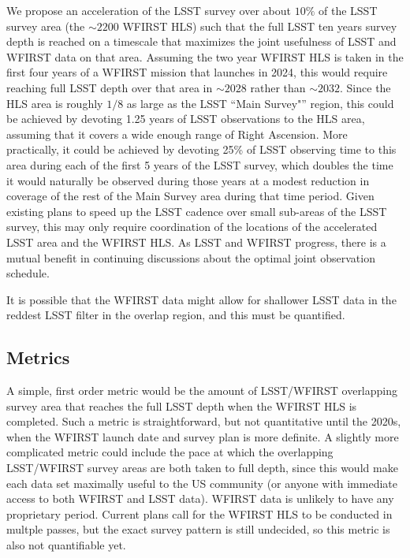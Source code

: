 We propose an acceleration of the LSST survey over about $10\%$ of the LSST survey area (the $\sim2200$ WFIRST HLS) such that the full LSST ten years survey depth is reached on a timescale that maximizes the joint usefulness of LSST and WFIRST data on that area.  Assuming the two year WFIRST HLS is taken in the first four years of a WFIRST mission that launches in 2024, this would require reaching full LSST depth over that area in $\sim2028$ rather than $\sim2032$. Since the HLS area is roughly $1/8$ as large as the LSST ``Main Survey"'' region, this could be achieved by devoting 1.25 years of LSST observations to the HLS area, assuming that it covers a wide enough range of Right Ascension.  More practically, it could be achieved by devoting 25\% of LSST observing time to this area during each of the first 5 years of the LSST survey, which doubles the time it would naturally be observed during those years at a modest reduction in coverage of the rest of the Main Survey area during that time period.   Given existing plans to speed up the LSST cadence over small sub-areas of the LSST survey, this may only require coordination of the locations of the accelerated LSST area and the WFIRST HLS. As LSST and WFIRST progress, there is a mutual benefit in continuing discussions about the optimal joint observation schedule.

It is possible that the WFIRST data might allow for shallower LSST data in the reddest LSST filter in the overlap region, and this must be quantified. 



\subsection{Metrics}
\label{sec:\secname:metrics}
A simple, first order metric would be the amount of LSST/WFIRST overlapping survey area that reaches the full LSST depth when the WFIRST HLS is completed.  Such a metric is straightforward, but not quantitative until the 2020s, when the WFIRST launch date and survey plan is more definite.  A slightly more complicated metric could include the pace at which the overlapping LSST/WFIRST survey areas are both taken to full depth, since this would make each data set maximally useful to the US community (or anyone with immediate access to both WFIRST and LSST data).  WFIRST data is unlikely to have any proprietary period.  Current plans call for the WFIRST HLS to be conducted in multple passes, but the exact survey pattern is still undecided, so this metric is also not quantifiable yet.   

